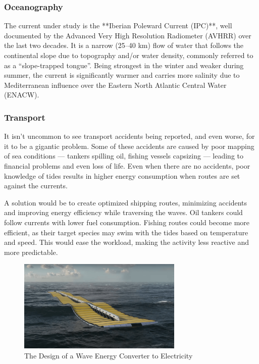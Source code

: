 \subsubsection{Oceanography}
\label{sec:Oceanography}

The current under study is the **Iberian Poleward Current (IPC)**, well documented by the Advanced Very High Resolution Radiometer (AVHRR)
over the last two decades. It is a narrow (25–40 km) flow of water that follows the continental slope due to topography and/or water density,
commonly referred to as a “slope-trapped tongue”. Being strongest in the winter and weaker during summer, the current is significantly warmer
and carries more salinity due to Mediterranean influence over the Eastern North Atlantic Central Water (ENACW).

\subsubsection{Transport}

It isn't uncommon to see transport accidents being reported, and even worse, for it to be a gigantic problem.
Some of these accidents are caused by poor mapping of sea conditions — tankers spilling oil, fishing vessels capsizing —
leading to financial problems and even loss of life. Even when there are no accidents, poor knowledge of tides results in higher energy consumption when routes are set against the currents.

A solution would be to create optimized shipping routes, minimizing accidents and improving energy efficiency while 
traversing the waves. Oil tankers could follow currents with lower fuel consumption. Fishing routes could become more
efficient, as their target species may swim with the tides based on temperature and speed. This would ease the workload,
making the activity less reactive and more predictable.

\begin{figure}[H]
    \centering
    \includegraphics[width=0.7\textwidth]{images/chapter/introduction/renewable_energy.png}
    \caption{The Design of a Wave Energy Converter to Electricity}
    \label{fig:WaveEnergyConverter}        
\end{figure}

